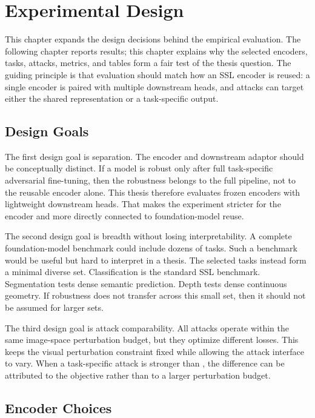 \chapter{Experimental Design}
\label{chap:experimental-design}

This chapter expands the design decisions behind the empirical evaluation. The following chapter reports results; this chapter explains why the selected encoders, tasks, attacks, metrics, and tables form a fair test of the thesis question. The guiding principle is that evaluation should match how an SSL encoder is reused: a single encoder is paired with multiple downstream heads, and attacks can target either the shared representation or a task-specific output.

\section{Design Goals}

The first design goal is separation. The encoder and downstream adaptor should be conceptually distinct. If a model is robust only after full task-specific adversarial fine-tuning, then the robustness belongs to the full pipeline, not to the reusable encoder alone. This thesis therefore evaluates frozen encoders with lightweight downstream heads. That makes the experiment stricter for the encoder and more directly connected to foundation-model reuse.

The second design goal is breadth without losing interpretability. A complete foundation-model benchmark could include dozens of tasks. Such a benchmark would be useful but hard to interpret in a thesis. The selected tasks instead form a minimal diverse set. Classification is the standard SSL benchmark. Segmentation tests dense semantic prediction. Depth tests dense continuous geometry. If robustness does not transfer across this small set, then it should not be assumed for larger sets.

The third design goal is attack comparability. All attacks operate within the same image-space perturbation budget, but they optimize different losses. This keeps the visual perturbation constraint fixed while allowing the attack interface to vary. When a task-specific attack is stronger than \EmbedAttack, the difference can be attributed to the objective rather than to a larger perturbation budget.

\section{Encoder Choices}

